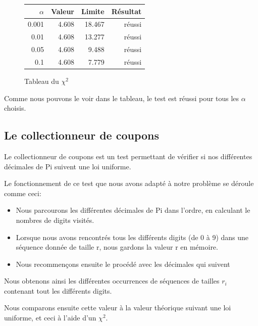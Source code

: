 \documentclass[10pt,a4paper]{article}
\begin{document}
	\begin{figure}[h]
		\centering
		\begin{tabular}{|r|r|r|r|}
			\hline
			$\alpha$ & Valeur & Limite & Résultat\\
			\hline
			0.001 & 4.608 & 18.467 & réussi\\
			0.01 & 4.608 & 13.277 & réussi\\
			0.05 & 4.608 & 9.488 & réussi\\
			0.1 & 4.608 & 7.779 & réussi\\
			\hline
		\end{tabular}
		\caption{Tableau du $\chi^2$}
	\end{figure}
	
	Comme nous pouvons le voir dans le tableau, le test est réussi pour tous les $\alpha$ choisis.	
		
\newpage
	
\subsection{Le collectionneur de coupons}
Le collectionneur de coupons est un test permettant de vérifier si nos différentes décimales de Pi suivent une loi uniforme.
 
Le fonctionnement de ce test que nous avons adapté à notre problème se déroule comme ceci:  
\begin{itemize}
\item Nous parcourons les différentes décimales de Pi dans l'ordre, en calculant le nombres de digits visités.
\item Lorsque nous avons rencontrés tous les différents digits (de 0 à 9) dans une séquence donnée de taille r, nous gardons la valeur r en mémoire.
\item Nous recommençons ensuite le procédé avec les décimales qui suivent 
\end{itemize}

Nous obtenons ainsi les différentes occurrences de séquences de tailles $r_i$ contenant tout les différents digits.

Nous comparons ensuite cette valeur à la valeur théorique suivant une loi uniforme, et ceci à l'aide d'un $\chi^2$.
\end{document}
